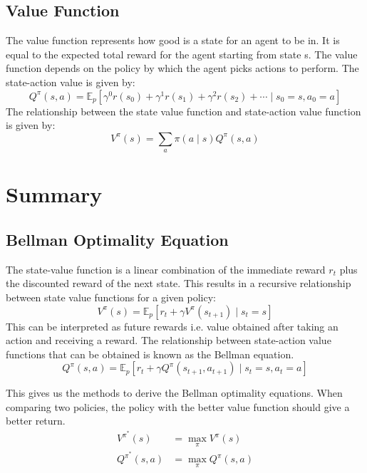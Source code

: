 \documentclass[11pt]{article}
\begin{document}
    \subsection*{Value Function}
    The value function represents how good is a state for an agent to be in. It is equal to the expected total reward for the agent starting from state s. The value function depends on the policy by which the agent picks actions to perform.\cite{Moustafa} The state-action value is given by:
    $$
Q^{\pi}(s, a)=\mathbb{E}_{p}\left[\gamma^{0} r\left(s_{0}\right)+\gamma^{1} r\left(s_{1}\right)+\gamma^{2} r\left(s_{2}\right)+\cdots \mid s_{0}=s, a_{0}=a\right]
$$
The relationship between the state value function and state-action value function is given by:
$$
V^{\pi}(s)=\sum_{a} \pi(a \mid s) Q^{\pi}(s, a)
$$








        

\section{Summary}
\subsection{Bellman Optimality Equation}
The state-value function is a linear combination of the immediate reward $r_{t}$ plus the discounted reward of the next state. This results in a recursive relationship between state value functions for a given policy:
$$
V^{\pi}(s)=\mathbb{E}_{p}\left[r_{t}+\gamma V^{\pi}\left(s_{t+1}\right) \mid s_{t}=s\right]
$$
This can be interpreted as future rewards i.e. value obtained after taking an action and receiving a reward. The relationship between state-action value functions that can be obtained is known as the Bellman equation.
$$
Q^{\pi}(s, a)=\mathbb{E}_{p}\left[r_{t}+\gamma Q^{\pi}\left(s_{t+1}, a_{t+1}\right) \mid s_{t}=s, a_{t}=a\right]
$$


This gives us the methods to derive the Bellman optimality equations. When comparing two policies, the policy with the better value function should give a better return.
$$
\begin{aligned}
V^{\pi^{*}}(s) &=\max _{\pi} V^{\pi}(s) \\
Q^{\pi^{*}}(s, a) &=\max _{\pi} Q^{\pi}(s, a)
\end{aligned}
$$
\end{document}
